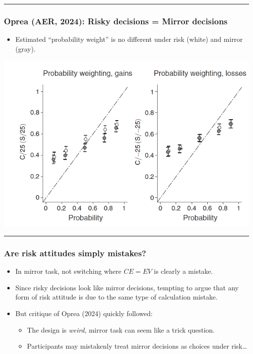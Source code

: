\documentclass[
  letterpaper,
  DIV=11,
  numbers=noendperiod]{scrartcl}
\providecommand{\tightlist}{%
  \setlength{\itemsep}{0pt}\setlength{\parskip}{0pt}}\usepackage{longtable,booktabs,array}
\begin{document}
\begin{center}\rule{0.5\linewidth}{0.5pt}\end{center}

\subsubsection{Oprea (AER, 2024): Risky decisions = Mirror
decisions}\label{oprea-aer-2024-risky-decisions-mirror-decisions}

\begin{itemize}
\tightlist
\item
  Estimated ``probability weight'' is no different under {risk (white)}
  and {mirror (gray)}.
\end{itemize}

\includegraphics[width=0.55\linewidth,height=\textheight,keepaspectratio]{figures/SimplicitlyEquivalents.png}

\begin{center}\rule{0.5\linewidth}{0.5pt}\end{center}

\subsubsection{Are risk attitudes simply
mistakes?}\label{are-risk-attitudes-simply-mistakes}

\begin{itemize}
\tightlist
\item
  In mirror task, not switching where \(CE = EV\) is clearly a mistake.
\item
  Since risky decisions look like mirror decisions, tempting to argue
  that any form of risk attitude is due to the same type of calculation
  mistake.
\item
  But critique of Oprea (2024) quickly followed:

  \begin{itemize}
  \tightlist
  \item
    The design is \emph{weird,} mirror task can seem like a trick
    question.
  \item
    Participants may mistakenly treat mirror decisions as choices under
    risk\ldots{}
  \end{itemize}
\end{itemize}
\end{document}
